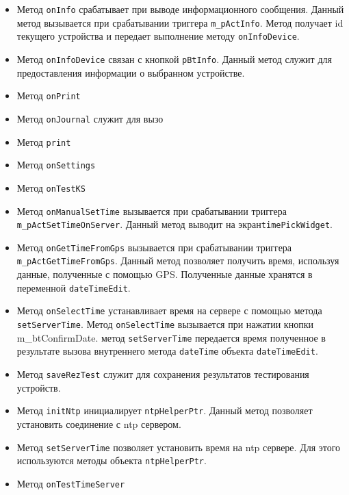 \begin{itemize}
	\item Метод \texttt{onInfo} срабатывает при выводе информационного сообщения. Данный метод вызывается при
		срабатывании триггера \texttt{m\_pActInfo}. Метод получает id текущего устройства и передает выполнение
		методу \texttt{onInfoDevice}.

	\item Метод \texttt{onInfoDevice} связан с кнопкой \texttt{pBtInfo}. Данный метод служит для предоставления
		информации о выбранном устройстве.

	\item Метод \texttt{onPrint}
	\item Метод \texttt{onJournal} служит для вызо%
	\item Метод \texttt{print}
	\item Метод \texttt{onSettings}
	\item Метод \texttt{onTestKS}
	\item Метод \texttt{onManualSetTime} вызывается при срабатывании триггера \texttt{m\_pActSetTimeOnServer}.
		Данный метод выводит на экран\break \texttt{timePickWidget}.

	\item Метод \texttt{onGetTimeFromGps} вызывается при срабатывании триггера \texttt{m\_pActGetTimeFromGps}.
		Данный метод позволяет получить время, используя данные, полученные с помощью GPS. Полученные данные
		хранятся в переменной \texttt{dateTimeEdit}.

	\item Метод \texttt{onSelectTime} устанавливает время на сервере с помощью метода \texttt{setServerTime}. Метод
		\texttt{onSelectTime} вызывается при нажатии кнопки {m\_btConfirmDate}.
		метод \texttt{setServerTime} передается время полученное в результате вызова внутреннего метода
		\texttt{dateTime} объекта \texttt{dateTimeEdit}.

	\item Метод \texttt{saveRezTest} служит для сохранения результатов тестирования устройств.
	\item Метод \texttt{initNtp} инициалирует \texttt{ntpHelperPtr}. Данный метод позволяет установить соединение с
		ntp сервером.

	\item Метод \texttt{setServerTime} позволяет установить время на ntp сервере. Для этого используются методы
		объекта \texttt{ntpHelperPtr}.

	\item Метод \texttt{onTestTimeServer}
\end{itemize}
